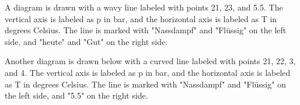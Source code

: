 A diagram is drawn with a wavy line labeled with points 21, 23, and 5.5. The vertical axis is labeled as p in bar, and the horizontal axis is labeled as T in degrees Celsius. The line is marked with "Nassdampf" and "Flüssig" on the left side, and "heute" and "Gut" on the right side.

Another diagram is drawn below with a curved line labeled with points 21, 22, 3, and 4. The vertical axis is labeled as p in bar, and the horizontal axis is labeled as T in degrees Celsius. The line is marked with "Nassdampf" and "Flüssig" on the left side, and "5.5" on the right side.